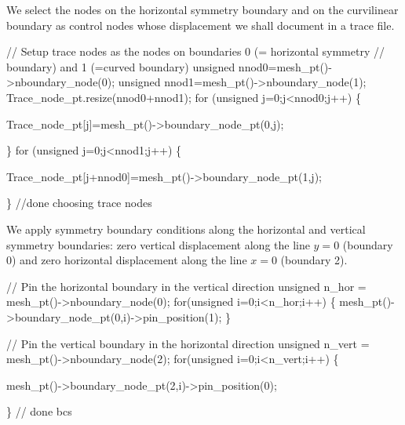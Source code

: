 We select the nodes on the horizontal symmetry boundary and on the curvilinear boundary as control nodes whose displacement we shall document in a trace file.


\begin{DoxyCodeInclude}


 \textcolor{comment}{// Setup trace nodes as the nodes on boundaries 0 (= horizontal symmetry}
 \textcolor{comment}{// boundary) and 1 (=curved boundary)}
 \textcolor{keywordtype}{unsigned} nnod0=mesh\_pt()->nboundary\_node(0);
 \textcolor{keywordtype}{unsigned} nnod1=mesh\_pt()->nboundary\_node(1);
 Trace\_node\_pt.resize(nnod0+nnod1);
 \textcolor{keywordflow}{for} (\textcolor{keywordtype}{unsigned} j=0;j<nnod0;j++)
  \{

   Trace\_node\_pt[j]=mesh\_pt()->boundary\_node\_pt(0,j);

  \}
 \textcolor{keywordflow}{for} (\textcolor{keywordtype}{unsigned} j=0;j<nnod1;j++)
  \{

   Trace\_node\_pt[j+nnod0]=mesh\_pt()->boundary\_node\_pt(1,j);

  \} \textcolor{comment}{//done choosing trace nodes}

\end{DoxyCodeInclude}


We apply symmetry boundary conditions along the horizontal and vertical symmetry boundaries\+: zero vertical displacement along the line $ y=0 $ (boundary 0) and zero horizontal displacement along the line $ x=0 $ (boundary 2).


\begin{DoxyCodeInclude}


 \textcolor{comment}{// Pin the horizontal boundary in the vertical direction}
 \textcolor{keywordtype}{unsigned} n\_hor = mesh\_pt()->nboundary\_node(0);
 \textcolor{keywordflow}{for}(\textcolor{keywordtype}{unsigned} i=0;i<n\_hor;i++)
  \{
   mesh\_pt()->boundary\_node\_pt(0,i)->pin\_position(1);
  \}

 \textcolor{comment}{// Pin the vertical boundary in the horizontal direction}
 \textcolor{keywordtype}{unsigned} n\_vert = mesh\_pt()->nboundary\_node(2);
 \textcolor{keywordflow}{for}(\textcolor{keywordtype}{unsigned} i=0;i<n\_vert;i++)
  \{

   mesh\_pt()->boundary\_node\_pt(2,i)->pin\_position(0);

  \} \textcolor{comment}{// done bcs}

\end{DoxyCodeInclude}


